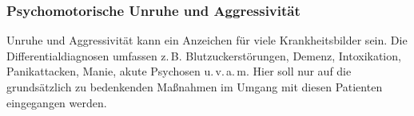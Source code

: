 % 
% 

% 
% 
% 
% 
% 
% 
% 
% 


\subsubsection{Psychomotorische Unruhe und Aggressivität}

Unruhe und Aggressivität kann ein Anzeichen für viele
Krankheitsbilder sein. Die Differentialdiagnosen umfassen
z.\,B. Blutzuckerstörungen, Demenz, Intoxikation,
Panikattacken, Manie, akute Psychosen u.\,v.\,a.\,m. Hier soll nur
auf die grundsätzlich zu bedenkenden Maßnahmen im Umgang mit diesen Patienten
eingegangen werden. 


